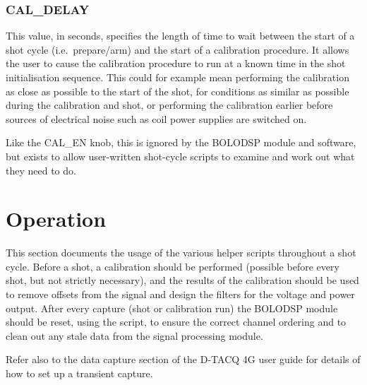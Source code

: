 \documentclass[12pt,a4paper]{article}
\begin{document}
\subsubsection{CAL{\_}DELAY}
This value, in seconds, specifies the length of time to wait between the start of a shot cycle (i.e.~prepare/arm) and the start of a calibration
procedure. It allows the user to cause the calibration procedure to run at a known time in the shot initialisation sequence. This could for example mean
performing the calibration as close as possible to the start of the shot, for conditions as similar as possible during the calibration and shot, or
performing the calibration earlier before sources of electrical noise such as coil power supplies are switched on.

Like the CAL{\_}EN knob, this is ignored by the BOLODSP module and software, but exists to allow user-written shot-cycle scripts to examine and work out
what they need to do.

\section{Operation}
\label{sec:operation}
This section documents the usage of the various helper scripts throughout a shot cycle. Before a shot, a calibration should be performed (possible before
every shot, but not strictly necessary), and the results of the calibration should be used to remove offsets from the signal and design the filters for
the voltage and power output. After every capture (shot or calibration run) the BOLODSP module should be reset, using the
\mbox{} script, to ensure the correct channel ordering and to clean out any stale data from the signal processing
module.

Refer also to the data capture section of the D-TACQ 4G user guide for details of how to set up a transient capture.
\end{document}
